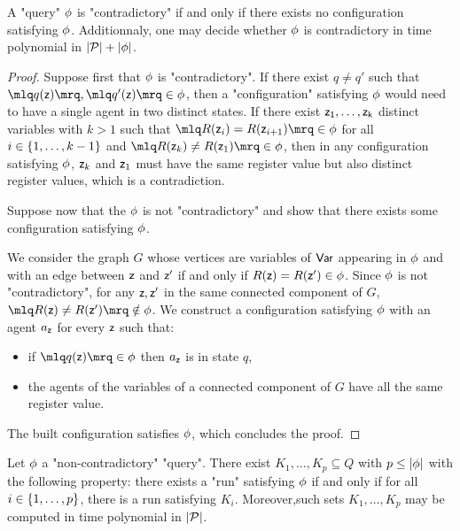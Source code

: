 \begin{proposition}
A "query" $\phi$ is "contradictory" if and only if there exists no configuration satisfying $\phi$. Additionnaly, one may decide whether $\phi$ is contradictory in time polynomial in $|\mathcal{P}| + |\phi|$. 
\end{proposition}
\begin{proof}
Suppose first that $\phi$ is "contradictory". If there exist $q \ne q'$ such that
 $\quotemarks{q(\varz)}, \quotemarks{q'(\varz)} \in \query$,  then a "configuration" satisfying $\phi$ would need to have a single agent in two distinct states. If there exist $\mathsf{z_1}, \ldots, \mathsf{z_k}$ distinct variables with $k>1$ such that $\quotemarks{R(\varz_{i}) = R(\varz_{i+1})} \in \query$ for all $i \in \{1,\ldots,k-1\}$ and $\quotemarks{R(\varz_k) \neq R(\varz_1)} \in \query$, then in any configuration satisfying $\phi$, $\mathsf{z}_k$ and $\mathsf{z}_1$ must have the same register value but also distinct register values, which is a contradiction. 

Suppose now that the $\phi$ is not "contradictory" and show that there exists some configuration satisfying $\phi$.

We consider the graph $G$ whose vertices are variables of $\mathsf{Var}$ appearing in $\phi$ and with an edge between $\mathsf{z}$ and $\mathsf{z}'$ if and only if $R(\mathsf{z}) = R(\mathsf{z}') \in \phi$. Since $\phi$ is not "contradictory", for any $\mathsf{z}, \mathsf{z}'$ in the same connected component of $G$, $\quotemarks{R(\varz) \ne R(\varz')} \notin \query$. We construct a configuration satisfying $\phi$ with an agent $a_{\mathsf{z}}$ for every $\mathsf{z}$ such that:
\begin{itemize}
\item if $\quotemarks{q(\varz)} \in \query$ then $a_{\mathsf{z}}$ is in state $q$,
\item the agents of the variables of a connected component of $G$ have all the same register value.  
\end{itemize}
The built configuration satisfies $\phi$, which concludes the proof. 
\end{proof}

\begin{lemma}
Let $\phi$ a  "non-contradictory" "query". There exist $K_1, \ldots, K_p \subseteq Q$ with $p \leq |\phi|$ with the following property: there exists a "run" satisfying $\phi$ if and only if for all $i \in \{1,\ldots, p\}$, there is a run satisfying $K_i$. Moreover,such sets $K_1, \dots, K_p$ may be computed in time polynomial in $|\mathcal{P}|$. 
\end{lemma}

